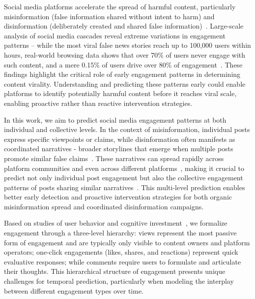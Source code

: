 Social media platforms accelerate the spread of harmful content, particularly misinformation (false information shared without intent to harm) and disinformation (deliberately created and shared false information)~\citep{lazer2018science,scheufele2019science}. Large-scale analysis of social media cascades reveal extreme variations in engagement patterns -- while the most viral false news stories reach up to 100,000 users within hours, real-world browsing data shows that over 70\% of users never engage with such content, and a mere 0.15\% of users drive over 80\% of engagement~\citep{vosoughi2018spread, grinberg2019fake,guess2020exposure}. These findings highlight the critical role of early engagement patterns in determining content virality. Understanding and predicting these patterns early could enable platforms to identify potentially harmful content before it reaches viral scale, enabling proactive rather than reactive intervention strategies.

In this work, we aim to predict social media engagement patterns at both individual and collective levels. In the context of misinformation, individual posts express specific viewpoints or claims, while disinformation often manifests as coordinated narratives - broader storylines that emerge when multiple posts promote similar false claims~\citep{del2016spreading,vosoughi2018spread}. These narratives can spread rapidly across platform communities and even across different platforms~\citep{wilson2020cross}, making it crucial to predict not only individual post engagement but also the collective engagement patterns of posts sharing similar narratives~\citep{bak2021stewardship}. This multi-level prediction enables better early detection and proactive intervention strategies for both organic misinformation spread and coordinated disinformation campaigns.

Based on studies of user behavior and cognitive investment~\citep{lorenz2011social,mosleh2021cognitive,pennycook2021shifting,brady2021social}, we formalize engagement through a three-level hierarchy: views represent the most passive form of engagement and are typically only visible to content owners and platform operators; one-click engagements (likes, shares, and reactions) represent quick evaluative responses; while comments require users to formulate and articulate their thoughts. This hierarchical structure of engagement presents unique challenges for temporal prediction, particularly when modeling the interplay between different engagement types over time.

